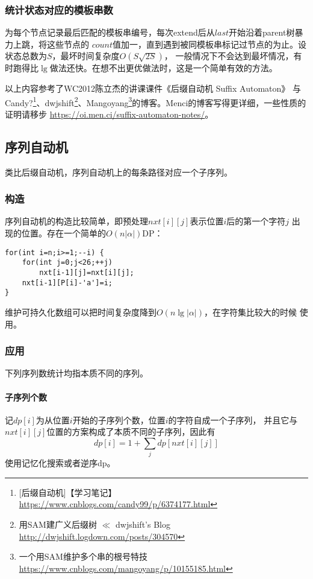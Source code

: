 \subsubsection{统计状态对应的模板串数}
为每个节点记录最后匹配的模板串编号，每次extend后从$last$开始沿着parent树暴力上跳，将这些节点的
$count$值加一，直到遇到被同模板串标记过节点的为止。设状态总数为$S$，最坏时间复杂度$O(S\sqrt{2S})$，
一般情况下不会达到最坏情况，有时跑得比$\lg$做法还快。在想不出更优做法时，这是一个简单有效的方法。

以上内容参考了WC2012陈立杰的讲课课件《后缀自动机 Suffix Automaton》
与Candy?\footnote{[后缀自动机]【学习笔记】
    \url{https://www.cnblogs.com/candy99/p/6374177.html}
}、dwjshift\footnote{
    用SAM建广义后缀树 $\ll$ dwjshift's Blog
    \url{http://dwjshift.logdown.com/posts/304570}
}、Mangoyang\footnote{
    一个用SAM维护多个串的根号特技
    \url{https://www.cnblogs.com/mangoyang/p/10155185.html}
}的博客。Menci的博客写得更详细，一些性质的证明请移步
\url{https://oi.men.ci/suffix-automaton-notes/}。

\subsection{序列自动机}
类比后缀自动机，序列自动机上的每条路径对应一个子序列。

\subsubsection{构造}
序列自动机的构造比较简单，即预处理$nxt[i][j]$表示位置$i$后的第一个字符$j$
出现的位置。存在一个简单的$O(n|\alpha|)$DP：
\begin{lstlisting}
for(int i=n;i>=1;--i) {
    for(int j=0;j<26;++j)
        nxt[i-1][j]=nxt[i][j];
    nxt[i-1][P[i]-'a']=i;
}
\end{lstlisting}

维护可持久化数组可以把时间复杂度降到$O(n\lg |\alpha|)$，在字符集比较大的时候
使用。
\subsubsection{应用}
下列序列数统计均指本质不同的序列。
\paragraph{子序列个数}
记$dp[i]$为从位置$i$开始的子序列个数，位置$i$的字符自成一个子序列，
并且它与$nxt[i][j]$位置的方案构成了本质不同的子序列，因此有
\begin{displaymath}
    dp[i]=1+\sum_j{dp[nxt[i][j]]}
\end{displaymath}
使用记忆化搜索或者逆序dp。
